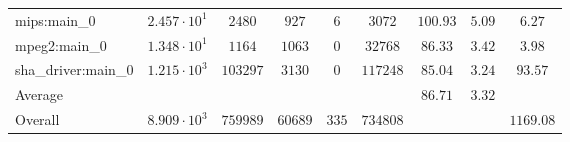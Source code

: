 \begin{tabular}{|l|c|c|c|c|c|c|c|c|}
mips:main\_0            & $ 2.457 \cdot 10^{1} $ & $ 2480   $ & $ 927   $ & $ 6   $ & $ 3072   $ & $ 100.93      $ & $ 5.09    $ & $ 6.27    $ \\
mpeg2:main\_0           & $ 1.348 \cdot 10^{1} $ & $ 1164   $ & $ 1063  $ & $ 0   $ & $ 32768  $ & $ 86.33       $ & $ 3.42    $ & $ 3.98    $ \\
sha\_driver:main\_0     & $ 1.215 \cdot 10^{3} $ & $ 103297 $ & $ 3130  $ & $ 0   $ & $ 117248 $ & $ 85.04       $ & $ 3.24    $ & $ 93.57   $ \\
\hline
Average                 & $                    $ & $        $ & $       $ & $     $ & $        $ & $ 86.71       $ & $ 3.32    $ & $         $ \\
\hline
Overall                 & $ 8.909 \cdot 10^{3} $ & $ 759989 $ & $ 60689 $ & $ 335 $ & $ 734808 $ & $             $ & $         $ & $ 1169.08 $ \\
\hline
\end{tabular}
